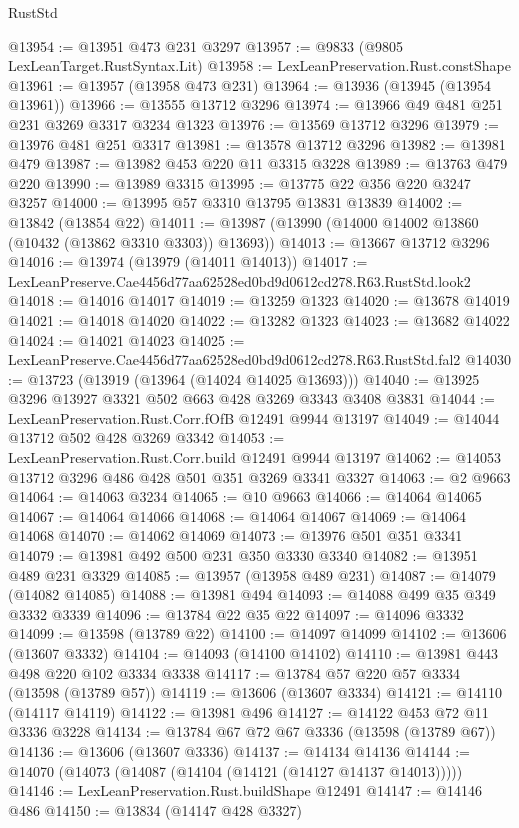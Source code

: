 \begin{lexlean}{RustStd}
\begin{coremodule}
@13954 := @13951 @473 @231 @3297
@13957 := @9833 (@9805 LexLeanTarget.RustSyntax.Lit)
@13958 := LexLeanPreservation.Rust.constShape
@13961 := @13957 (@13958 @473 @231)
@13964 := @13936 (@13945 (@13954 @13961))
@13966 := @13555 @13712 @3296
@13974 := @13966 @49 @481 @251 @231 @3269 @3317 @3234 @1323
@13976 := @13569 @13712 @3296
@13979 := @13976 @481 @251 @3317
@13981 := @13578 @13712 @3296
@13982 := @13981 @479
@13987 := @13982 @453 @220 @11 @3315 @3228
@13989 := @13763 @479 @220
@13990 := @13989 @3315
@13995 := @13775 @22 @356 @220 @3247 @3257
@14000 := @13995 @57 @3310 @13795 @13831 @13839
@14002 := @13842 (@13854 @22)
@14011 := @13987 (@13990 (@14000 @14002 @13860 (@10432 (@13862 @3310 @3303)) @13693))
@14013 := @13667 @13712 @3296
@14016 := @13974 (@13979 (@14011 @14013))
@14017 := LexLeanPreserve.Cae4456d77aa62528ed0bd9d0612cd278.R63.RustStd.look2
@14018 := @14016 @14017
@14019 := @13259 @1323
@14020 := @13678 @14019
@14021 := @14018 @14020
@14022 := @13282 @1323
@14023 := @13682 @14022
@14024 := @14021 @14023
@14025 := LexLeanPreserve.Cae4456d77aa62528ed0bd9d0612cd278.R63.RustStd.fal2
@14030 := @13723 (@13919 (@13964 (@14024 @14025 @13693)))
@14040 := @13925 @3296 @13927 @3321 @502 @663 @428 @3269 @3343 @3408 @3831
@14044 := LexLeanPreservation.Rust.Corr.fOfB @12491 @9944 @13197
@14049 := @14044 @13712 @502 @428 @3269 @3342
@14053 := LexLeanPreservation.Rust.Corr.build @12491 @9944 @13197
@14062 := @14053 @13712 @3296 @486 @428 @501 @351 @3269 @3341 @3327
@14063 := @2 @9663
@14064 := @14063 @3234
@14065 := @10 @9663
@14066 := @14064 @14065
@14067 := @14064 @14066
@14068 := @14064 @14067
@14069 := @14064 @14068
@14070 := @14062 @14069
@14073 := @13976 @501 @351 @3341
@14079 := @13981 @492 @500 @231 @350 @3330 @3340
@14082 := @13951 @489 @231 @3329
@14085 := @13957 (@13958 @489 @231)
@14087 := @14079 (@14082 @14085)
@14088 := @13981 @494
@14093 := @14088 @499 @35 @349 @3332 @3339
@14096 := @13784 @22 @35 @22
@14097 := @14096 @3332
@14099 := @13598 (@13789 @22)
@14100 := @14097 @14099
@14102 := @13606 (@13607 @3332)
@14104 := @14093 (@14100 @14102)
@14110 := @13981 @443 @498 @220 @102 @3334 @3338
@14117 := @13784 @57 @220 @57 @3334 (@13598 (@13789 @57))
@14119 := @13606 (@13607 @3334)
@14121 := @14110 (@14117 @14119)
@14122 := @13981 @496
@14127 := @14122 @453 @72 @11 @3336 @3228
@14134 := @13784 @67 @72 @67 @3336 (@13598 (@13789 @67))
@14136 := @13606 (@13607 @3336)
@14137 := @14134 @14136
@14144 := @14070 (@14073 (@14087 (@14104 (@14121 (@14127 @14137 @14013)))))
@14146 := LexLeanPreservation.Rust.buildShape @12491
@14147 := @14146 @486
@14150 := @13834 (@14147 @428 @3327)

\end{coremodule}
\end{lexlean}
